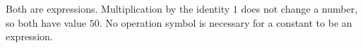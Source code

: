 Both are expressions. Multiplication by the identity $1$ does not change a number, so both have value $\boxed{50}$. No operation symbol is necessary for a constant to be an expression.
